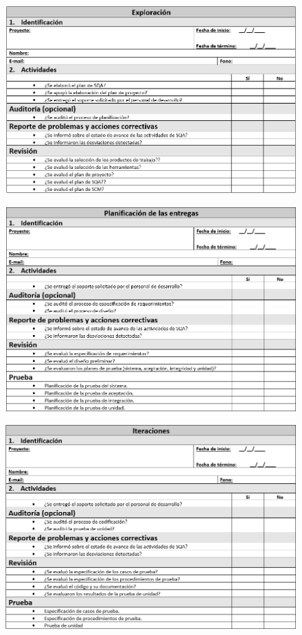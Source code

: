 \begin{figure}[H]
\centering
\includegraphics[width=1\textwidth]{figures/anexos/3-1-1.PNG}
\end{figure}

\begin{figure}[H]
\centering
\includegraphics[width=1\textwidth]{figures/anexos/3-1-2.PNG}
\end{figure}

\begin{figure}[H]
\centering
\includegraphics[width=1\textwidth]{figures/anexos/3-1-3.PNG}
\end{figure}

